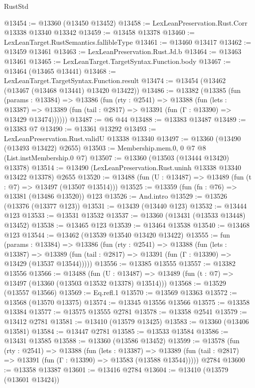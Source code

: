 \begin{lexlean}{RustStd}
\begin{coremodule}
@13454 := @13360 (@13450 @13452)
@13458 := LexLeanPreservation.Rust.Corr @13338 @13340 @13342
@13459 := @13458 @13378
@13460 := LexLeanTarget.RustSemantics.fallibleType
@13461 := @13460 @13417
@13462 := @13459 @13461
@13463 := LexLeanPreservation.Rust.Jd.b
@13464 := @13463 @13461
@13465 := LexLeanTarget.TargetSyntax.Function.body
@13467 := @13464 (@13465 @13441)
@13468 := LexLeanTarget.TargetSyntax.Function.result
@13474 := @13454 (@13462 (@13467 (@13468 @13441) @13420 @13422))
@13486 := @13382
    (@13385
      (fun (params : @13384) =>
      @13386
        (fun (rty : @2541) =>
        @13388
          (fun (lets : @13387) =>
          @13389 (fun (tail : @2817) => @13391 (fun (Γ : @13390) => @13429 @13474))))))
@13487 := @6 @44
@13488 := @13383 @13487
@13489 := @13383 @7
@13490 := @13361 @13292
@13493 := LexLeanPreservation.Rust.validU @13338 @13340
@13497 := @13360 (@13490 (@13493 @13422) @2655)
@13503 := Membership.mem.{0, 0} @7 @8 (List.instMembership.{0} @7)
@13507 := @13360 (@13503 (@13444 @13420) @13378)
@13514 := @13490 (LexLeanPreservation.Rust.uninh @13338 @13340 @13422 @13378) @2655
@13520 := @13488 (fun (U : @13487) => @13489 (fun (t : @7) => @13497 (@13507 @13514)))
@13525 := @13359 (fun (fn : @76) => @13381 (@13486 @13520)) @123
@13526 := And.intro
@13529 := @13526 (@13376 (@13377 @123))
@13531 := @13439 (@13440 @123)
@13532 := @13444 @123
@13533 := @13531 @13532
@13537 := @13360 (@13431 (@13533 @13448) @13452)
@13538 := @13465 @123
@13539 := @13464 @13538
@13540 := @13468 @123
@13544 := @13462 (@13539 @13540 @13420 @13422)
@13555 := fun (params : @13384) =>
  @13386
    (fun (rty : @2541) =>
    @13388
      (fun (lets : @13387) =>
      @13389 (fun (tail : @2817) => @13391 (fun (Γ : @13390) => @13429 (@13537 @13544)))))
@13556 := @13385 @13555
@13557 := @13382 @13556
@13566 := @13488
    (fun (U : @13487) => @13489 (fun (t : @7) => @13497 (@13360 (@13503 @13532 @13378) @13514)))
@13568 := @13529 (@13557 @13566)
@13569 := Eq.refl.{1}
@13570 := @13569 @13363
@13572 := @13568 (@13570 @13375)
@13574 := @13345 @13556 @13566
@13575 := @13358 @13384
@13577 := @13575 @13555 @2781
@13578 := @13358 @2541
@13579 := @13412 @2781
@13581 := @13410 (@13579 @13425)
@13583 := @13360 (@13406 @13581)
@13584 := @13447 @2781
@13585 := @13533 @13584
@13586 := @13431 @13585
@13588 := @13360 (@13586 @13452)
@13599 := @13578
    (fun (rty : @2541) =>
    @13388
      (fun (lets : @13387) =>
      @13389 (fun (tail : @2817) => @13391 (fun (Γ : @13390) => @13583 (@13588 @13544)))))
    @2784
@13600 := @13358 @13387
@13601 := @13416 @2784
@13604 := @13410 (@13579 (@13601 @13424))

\end{coremodule}
\end{lexlean}
